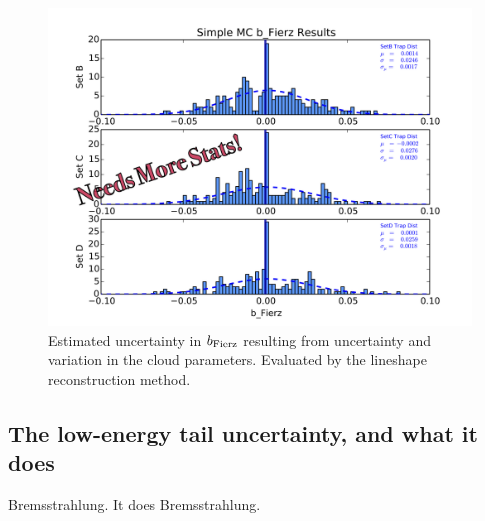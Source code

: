 	    \begin{figure}[h!!]
    	\centering
    	\includegraphics[width=.999\linewidth]
    	{Figures/Position_Err_bFierz_prelim.png}
    	\caption[$\bFierz$ Position Error]{Estimated uncertainty in $\bFierz$ resulting from uncertainty and variation in the cloud parameters.  Evaluated by the lineshape reconstruction method.}		
    	\label{fig:bFierz_position_err}
		\end{figure}

	
	\subsection{The low-energy tail uncertainty, and what it does}
	Bremsstrahlung.  It does Bremsstrahlung.


